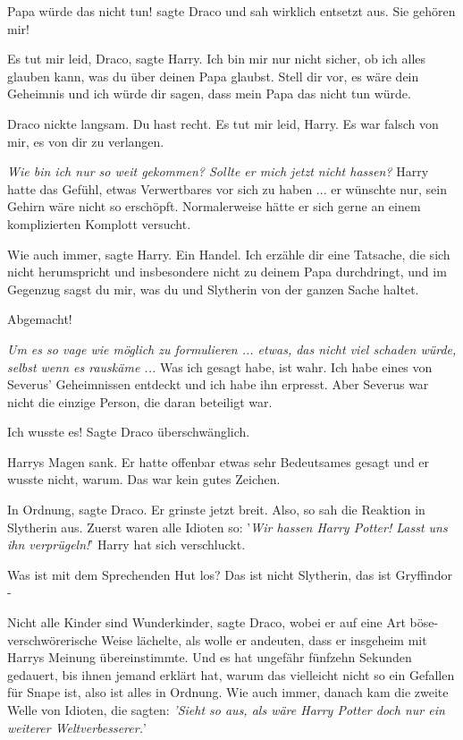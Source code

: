 \glqq{}Papa würde das nicht tun!\grqq{} sagte Draco und sah wirklich entsetzt
aus. \glqq{}Sie gehören mir!\grqq{}

\glqq{}Es tut mir leid, Draco\grqq{}, sagte Harry. \glqq{}Ich bin mir nur nicht
sicher, ob ich alles glauben kann, was du über deinen Papa glaubst. Stell dir
vor, es wäre dein Geheimnis und ich würde dir sagen, dass mein Papa das nicht
tun würde.\grqq{}

Draco nickte langsam. \glqq{}Du hast recht. Es tut mir leid, Harry. Es war falsch
von mir, es von dir zu verlangen.\grqq{}

\emph{Wie bin ich nur so weit gekommen? Sollte er mich jetzt nicht hassen?}
Harry hatte das Gefühl, etwas Verwertbares vor sich zu haben ... er wünschte
nur, sein Gehirn wäre nicht so erschöpft. Normalerweise hätte er sich gerne an
einem komplizierten Komplott versucht.

\glqq{}Wie auch immer\grqq{}, sagte Harry. \glqq{}Ein Handel. Ich erzähle dir eine
Tatsache, die sich nicht herumspricht und insbesondere nicht zu deinem Papa
durchdringt, und im Gegenzug sagst du mir, was du und Slytherin von der ganzen
Sache haltet.\grqq{}

\glqq{}Abgemacht!\grqq{}

\emph{Um es so vage wie möglich zu formulieren ... etwas, das nicht viel schaden
würde, selbst wenn es rauskäme ...} \glqq{}Was ich gesagt habe, ist wahr. Ich habe
eines von Severus' Geheimnissen entdeckt und ich habe ihn erpresst. Aber Severus
war nicht die einzige Person, die daran beteiligt war.\grqq{}

\glqq{}Ich wusste es!\grqq{} Sagte Draco überschwänglich.

Harrys Magen sank. Er hatte offenbar etwas sehr Bedeutsames gesagt und er wusste
nicht, warum. Das war kein gutes Zeichen.

\glqq{}In Ordnung\grqq{}, sagte Draco. Er grinste jetzt breit. \glqq{}Also, so sah
die Reaktion in Slytherin aus. Zuerst waren alle Idioten so: '\emph{Wir hassen
Harry Potter! Lasst uns ihn verprügeln!}'\grqq{} Harry hat sich verschluckt.

\glqq{}Was ist mit dem Sprechenden Hut los? Das ist nicht Slytherin, das ist
Gryffindor -\grqq{}

\glqq{}Nicht alle Kinder sind Wunderkinder\grqq{}, sagte Draco, wobei er auf eine
Art böse-verschwörerische Weise lächelte, als wolle er andeuten, dass er
insgeheim mit Harrys Meinung übereinstimmte. \glqq{}Und es hat ungefähr fünfzehn
Sekunden gedauert, bis ihnen jemand erklärt hat, warum das vielleicht nicht so
ein Gefallen für Snape ist, also ist alles in Ordnung. Wie auch immer, danach
kam die zweite Welle von Idioten, die sagten: \emph{'Sieht so aus, als wäre
Harry Potter doch nur ein weiterer Weltverbesserer.}'\grqq{}

